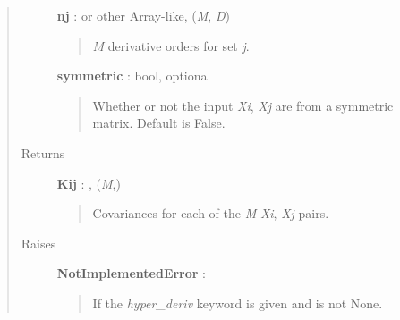 \documentclass[letterpaper,10pt,english]{sphinxmanual}
\begin{document}
\begin{fulllineitems}
\begin{fulllineitems}
\begin{quote}
\begin{description}
\textbf{nj} :  or other Array-like, (\emph{M}, \emph{D})
\begin{quote}

\emph{M} derivative orders for set \emph{j}.
\end{quote}

\textbf{symmetric} : bool, optional
\begin{quote}

Whether or not the input \emph{Xi}, \emph{Xj} are from a symmetric matrix.
Default is False.
\end{quote}

\item[{Returns}] \leavevmode
\textbf{Kij} : , (\emph{M},)
\begin{quote}

Covariances for each of the \emph{M} \emph{Xi}, \emph{Xj} pairs.
\end{quote}

\item[{Raises}] \leavevmode
\textbf{NotImplementedError} :
\begin{quote}

If the \emph{hyper\_deriv} keyword is given and is not None.
\end{quote}

\end{description}\end{quote}

\end{fulllineitems}


\end{fulllineitems}

\end{document}
